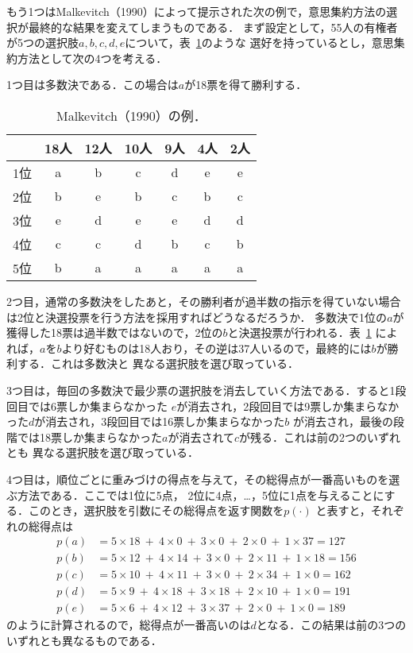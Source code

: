 \documentclass[dvipdfmx]{jsarticle}
\begin{document}
もう1つはMalkevitch（1990）によって提示された次の例で，意思集約方法の選択が最終的な結果を変えてしまうものである．
まず設定として，55人の有権者が5つの選択肢$a,b,c,d,e$について，表~\ref{tab:Malkevitch}のような
選好を持っているとし，意思集約方法として次の4つを考える．

1つ目は多数決である．この場合は$a$が18票を得て勝利する．

\begin{table}[h]
  \caption{Malkevitch（1990）の例．}\label{tab:Malkevitch}
  \begin{center}
    \begin{tabular}{c|c|c|c|c|c|c}
      & 18人 & 12人 & 10人 & 9人 & 4人 & 2人 \\ \hline
    1位 & a & b & c & d & e & e \\
    2位 & b & e & b & c & b & c \\
    3位 & e & d & e & e & d & d \\
    4位 & c & c & d & b & c & b \\
    5位 & b & a & a & a & a & a \\
\end{tabular}
  \end{center}
\end{table}

2つ目，通常の多数決をしたあと，その勝利者が過半数の指示を得ていない場合は2位と決選投票を行う方法を採用すればどうなるだろうか．
多数決で1位の$a$が獲得した18票は過半数ではないので，2位の$b$と決選投票が行われる．表~\ref{tab:Malkevitch}
によれば，$a$を$b$より好むものは18人おり，その逆は37人いるので，最終的には$b$が勝利する．これは多数決と
異なる選択肢を選び取っている．

3つ目は，毎回の多数決で最少票の選択肢を消去していく方法である．すると1段回目では6票しか集まらなかった
$e$が消去され，2段回目では9票しか集まらなかった$d$が消去され，3段回目では16票しか集まらなかった$b$
が消去され，最後の段階では18票しか集まらなかった$a$が消去されて$c$が残る．これは前の2つのいずれとも
異なる選択肢を選び取っている．

4つ目は，順位ごとに重みづけの得点を与えて，その総得点が一番高いものを選ぶ方法である．ここでは1位に5点，
2位に4点，\ldots，5位に1点を与えることにする．このとき，選択肢を引数にその総得点を返す関数を$p(\cdot)$
と表すと，それぞれの総得点は
\begin{align*}
  p(a) &= 5 \times 18 \ +\  4 \times 0 \ +\ 3 \times 0 \ +\  2 \times 0\ +\ 1 \times 37 = 127 \\
  p(b) &= 5 \times 12 \ +\  4 \times 14 \ +\ 3 \times 0 \ +\  2 \times 11 \ +\ 1 \times 18 = 156 \\
  p(c) &= 5 \times 10 \ +\  4 \times 11 \ +\ 3 \times 0 \ +\  2 \times 34 \ +\ 1 \times 0 = 162 \\
  p(d) &= 5 \times 9 \ +\  4 \times 18 \ +\ 3 \times 18 \ +\  2 \times 10 \ +\ 1 \times 0 = 191 \\
  p(e) &= 5 \times 6 \ +\  4 \times 12 \ +\ 3 \times 37 \ +\  2 \times 0 \ +\ 1 \times 0 = 189
\end{align*}
のように計算されるので，総得点が一番高いのは$d$となる．この結果は前の3つのいずれとも異なるものである．
\end{document}
